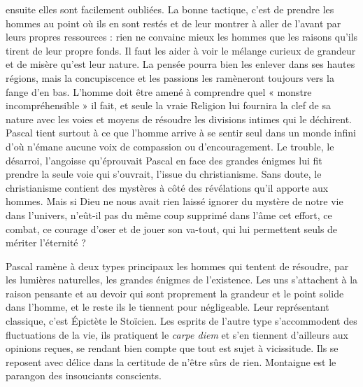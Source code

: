 \documentclass[12pt,a4paper]{article}
\newcommand{\opage}[1]{\marginnote{\footnotesize\textit{[#1]}}}
\begin{document}
ensuite elles sont facilement oubliées. La bonne tactique, c'est de
prendre les hommes au point où ils en sont restés et de leur
montrer à aller de l'avant par leurs propres ressources : rien ne
convainc mieux les hommes que les raisons qu'ils tirent de leur
propre fonds. Il faut les aider à voir le mélange curieux de grandeur
et de misère qu'est leur nature. La pensée pourra bien les enlever
dans ses hautes régions, mais la concupiscence et les passions
les ramèneront toujours vers la fange d'en bas. L'homme doit être
amené à comprendre quel « monstre incompréhensible » il fait, et
\opage{231} seule la vraie Religion lui fournira la clef de sa nature avec les voies
et moyens de résoudre les divisions intimes qui le déchirent. Pascal
tient surtout à ce que l'homme arrive à se sentir seul dans un
monde infini d'où n'émane aucune voix de compassion ou d'encouragement.
Le trouble, le désarroi, l'angoisse qu'éprouvait Pascal
en face des grandes énigmes lui fit prendre la seule voie qui s'ouvrait,
l'issue du christianisme. Sans doute, le christianisme contient
des mystères à côté des révélations qu'il apporte aux hommes.
Mais si Dieu ne nous avait rien laissé ignorer du mystère de notre
vie dans l'univers, n'eût-il pas du même coup supprimé dans l'âme
cet effort, ce combat, ce courage d'oser et de jouer son va-tout, qui
lui permettent seuls de mériter l'éternité ?

Pascal ramène à deux types principaux les hommes qui tentent
de résoudre, par les lumières naturelles, les grandes énigmes de
l'existence. Les uns s'attachent à la raison pensante et au devoir
qui sont proprement la grandeur et le point solide dans l'homme,
et le reste ils le tiennent pour négligeable. Leur représentant classique,
c'est Épictète le Stoïcien. Les esprits de l'autre type s'accommodent
des fluctuations de la vie, ils pratiquent le \emph{carpe diem} et
s'en tiennent d'ailleurs aux opinions reçues, se rendant bien compte
que tout est sujet à vicissitude. Ils se reposent avec délice dans la
certitude de n'être sûrs de rien. Montaigne est le parangon des insouciants
conscients.
\end{document}
